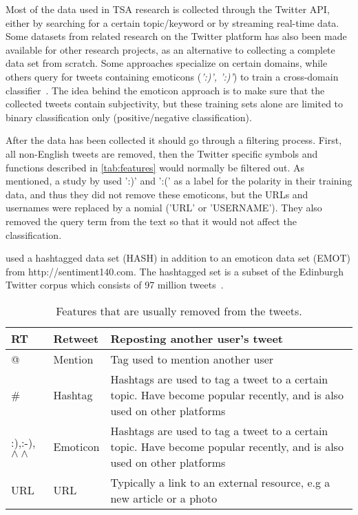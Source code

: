 Most of the data used in TSA research is collected through the Twitter API, either by searching for a certain topic/keyword or by streaming real-time data. Some datasets from related research on the Twitter platform has also been made available for other research projects, as an alternative to collecting a complete data set from scratch. Some approaches specialize on certain domains, while others query for tweets containing emoticons (\emph{':)', ':)'}) to train a cross-domain classifier~\citep{article:go}. The idea behind the emoticon approach is to make sure that the collected tweets contain subjectivity, but these training sets alone are limited to binary classification only (positive/negative classification).

After the data has been collected it should go through a filtering process. First, all non-English tweets are removed, then the Twitter specific symbols and functions described in \autoref{tab:features} would normally be filtered out. As mentioned, a study by \cite{article:go} used ':)' and ':(' as a label for the polarity in their training data, and thus they did not remove these emoticons, but the URLs and usernames were replaced by a nomial ('URL' or 'USERNAME'). They also removed the query term from the text so that it would not affect the classification.

\cite{article:omg} used a hashtagged data set (HASH) in addition to an emoticon data set (EMOT) from http://sentiment140.com. The hashtagged set is a subset of the Edinburgh Twitter corpus which consists of 97 million tweets~\citep{article:edinburgh}.

\begin{table}[]
\centering
\begin{tabular}{|l|l|p{8cm}|}
\hline
RT & Retweet & Reposting another user’s tweet \\ \hline
@ & Mention & Tag used to mention another user \\ \hline
\# & Hashtag & Hashtags are used to tag a tweet to a certain topic. Have become popular recently, and is also used on other platforms \\ \hline
:),:-),$\wedge\wedge$ & Emoticon & Hashtags are used to tag a tweet to a certain topic. Have become popular recently, and is also used on other platforms \\ \hline
URL & URL & Typically a link to an external resource, e.g a new article or a photo \\ \hline
\end{tabular}
\caption{Features that are usually removed from the tweets.}
\label{tab:features}
\end{table}

